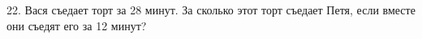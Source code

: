 22. Вася съедает торт за 28 минут. За сколько этот торт съедает Петя, если вместе они съедят его за 12 минут?\\
